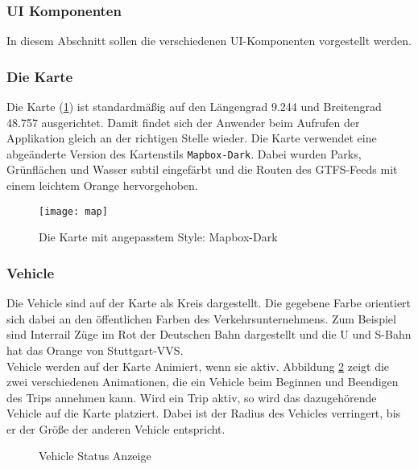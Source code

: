 \subsubsection{UI Komponenten}
\label{ssub:ui_komponenten}

  In diesem Abschnitt sollen die verschiedenen UI-Komponenten vorgestellt werden.

  \subsubsection*{Die Karte}
  \label{ssub:die_karte}
    Die Karte (\ref{fig:map}) ist standardmäßig auf den Längengrad 9.244 und Breitengrad 48.757 ausgerichtet. Damit findet sich der Anwender beim Aufrufen der Applikation gleich an der richtigen Stelle wieder. Die Karte verwendet eine abgeänderte Version des Kartenstils \texttt{Mapbox-Dark}. Dabei wurden Parks, Grünflächen und Wasser subtil eingefärbt und die Routen des GTFS-Feeds mit einem leichtem Orange hervorgehoben.

    \begin{figure}[htbp]
      \begin{center}
        \texttt{[image: map]}
        \caption{Die Karte mit angepasstem Style: Mapbox-Dark}
        \label{fig:map}
      \end{center}
    \end{figure}
    

  \subsubsection*{Vehicle}
  \label{ssub:vehicle_auf_karte}
    Die Vehicle sind auf der Karte als Kreis dargestellt. Die gegebene Farbe orientiert sich dabei an den öffentlichen Farben des Verkehrsunternehmens. Zum Beispiel sind Interrail Züge im Rot der Deutschen Bahn dargestellt und die U und S-Bahn hat das Orange von Stuttgart-VVS.\\

    Vehicle werden auf der Karte Animiert, wenn sie aktiv. Abbildung \ref{fig:vehicle_states} zeigt die zwei verschiedenen Animationen, die ein Vehicle beim Beginnen und Beendigen des Trips annehmen kann. Wird ein Trip aktiv, so wird das dazugehörende Vehicle auf die Karte platziert. Dabei ist der Radius des Vehicles verringert, bis er der Größe der anderen Vehicle entspricht.

    \begin{figure}[htbp]
      \centering
      \hfill
      \caption{Vehicle Status Anzeige}
      \label{fig:vehicle_states}
    \end{figure}

